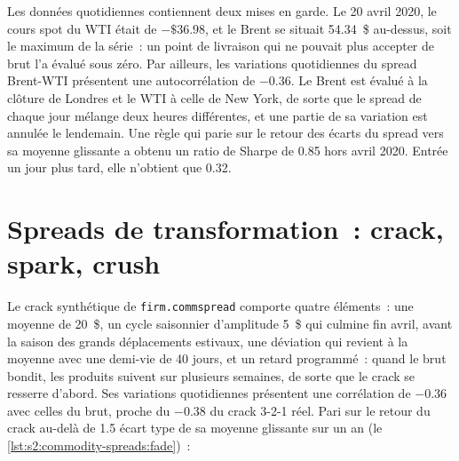 Les données quotidiennes contiennent deux mises en garde. Le 20 avril 2020, le cours spot du WTI était de $-\$36.98$, et le Brent se situait 54.34~\$ au-dessus, soit le maximum de la série~: un point
de livraison qui ne pouvait plus accepter de brut l'a évalué sous zéro. Par ailleurs, les variations quotidiennes du spread Brent-WTI présentent une autocorrélation de $-0.36$. Le Brent est
évalué à la clôture de Londres et le WTI à celle de New York, de sorte que le spread de chaque jour mélange deux heures différentes, et une partie de sa variation est annulée le lendemain. Une règle qui
parie sur le retour des écarts du spread vers sa moyenne glissante a obtenu un ratio de Sharpe de 0.85 hors avril 2020. Entrée un jour plus tard, elle n'obtient que 0.32.

\begin{omfigure}

\label{fig:s2:commodity-spreads:real}
\end{omfigure}

\section{Spreads de transformation~: crack, spark, crush}

Le crack synthétique de \texttt{firm.commspread} comporte quatre éléments~: une moyenne de 20~\$, un cycle saisonnier d'amplitude 5~\$ qui culmine fin avril, avant la
saison des grands déplacements estivaux, une déviation qui revient à la moyenne avec une demi-vie de 40 jours, et un retard programmé~: quand le brut bondit, les produits suivent sur plusieurs semaines, de sorte que le
crack se resserre d'abord. Ses variations quotidiennes présentent une corrélation de $-0.36$ avec celles du brut, proche du $-0.38$ du crack 3-2-1 réel. Pari sur le retour du crack
au-delà de 1.5 écart type de sa moyenne glissante sur un an (le \cref{lst:s2:commodity-spreads:fade})~:

